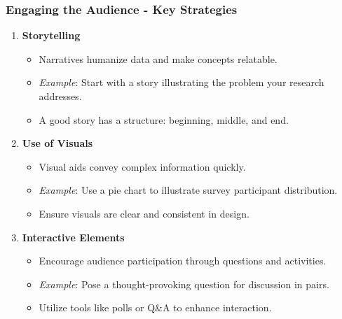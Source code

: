 \documentclass[aspectratio=169]{beamer}
\begin{document}
\begin{frame}[fragile]
    \frametitle{Engaging the Audience - Key Strategies}
    \begin{enumerate}
        \item \textbf{Storytelling}
            \begin{itemize}
                \item Narratives humanize data and make concepts relatable.
                \item \textit{Example}: Start with a story illustrating the problem your research addresses.
                \item A good story has a structure: beginning, middle, and end.
            \end{itemize}
        
        \item \textbf{Use of Visuals}
            \begin{itemize}
                \item Visual aids convey complex information quickly.
                \item \textit{Example}: Use a pie chart to illustrate survey participant distribution.
                \item Ensure visuals are clear and consistent in design.
            \end{itemize}
        
        \item \textbf{Interactive Elements}
            \begin{itemize}
                \item Encourage audience participation through questions and activities.
                \item \textit{Example}: Pose a thought-provoking question for discussion in pairs.
                \item Utilize tools like polls or Q\&A to enhance interaction.
            \end{itemize}
    \end{enumerate}
\end{frame}
\end{document}
